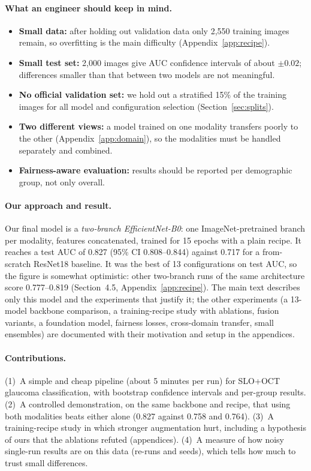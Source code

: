 \documentclass[11pt]{article}
\begin{document}
\paragraph{What an engineer should keep in mind.}
\begin{itemize}
\item \textbf{Small data:} after holding out validation data only 2{,}550 training images remain, so overfitting is the main difficulty (Appendix~\ref{app:recipe}).
\item \textbf{Small test set:} 2{,}000 images give AUC confidence intervals of about $\pm0.02$; differences smaller than that between two models are not meaningful.
\item \textbf{No official validation set:} we hold out a stratified 15\% of the training images for all model and configuration selection (Section~\ref{sec:splits}).
\item \textbf{Two different views:} a model trained on one modality transfers poorly to the other (Appendix~\ref{app:domain}), so the modalities must be handled separately and combined.
\item \textbf{Fairness-aware evaluation:} results should be reported per demographic group, not only overall.
\end{itemize}

\paragraph{Our approach and result.}
Our final model is a \emph{two-branch EfficientNet-B0}: one ImageNet-pretrained branch per modality, features concatenated, trained for 15 epochs with a plain recipe. It reaches a test AUC
of 0.827 (95\% CI 0.808--0.844) against 0.717 for a from-scratch ResNet18 baseline. It was the best of 13 configurations on test AUC, so the figure is somewhat optimistic: other two-branch runs of the same architecture score 0.777--0.819
(Section~4.5, Appendix~\ref{app:recipe}). The main text describes only this model and the experiments that justify it; the other experiments (a 13-model backbone comparison, a training-recipe study with ablations, fusion variants, a foundation model, fairness losses,
cross-domain transfer, small ensembles) are documented with their motivation and setup in the appendices.

\paragraph{Contributions.}
(1)~A simple and cheap pipeline (about 5 minutes per run) for SLO+OCT glaucoma classification, with bootstrap confidence intervals and per-group results.
(2)~A controlled demonstration, on the same backbone and recipe, that using both modalities beats either alone (0.827 against 0.758 and 0.764).
(3)~A training-recipe study in which stronger augmentation hurt, including a hypothesis of ours that the ablations refuted (appendices).
(4)~A measure of how noisy single-run results are on this data (re-runs and seeds), which tells how much to trust small differences.
\end{document}
